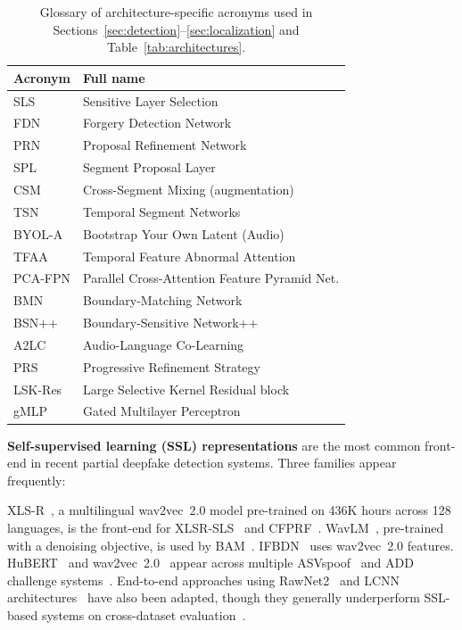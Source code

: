 \documentclass[journal]{IEEEtran}
\begin{document}
\begin{table}[t]
\centering
\caption{Glossary of architecture-specific acronyms used in Sections~\ref{sec:detection}--\ref{sec:localization} and Table~\ref{tab:architectures}.}
\label{tab:glossary}
\small
\begin{tabular}{ll}
\toprule
\textbf{Acronym} & \textbf{Full name} \\
\midrule
SLS & Sensitive Layer Selection \\
FDN & Forgery Detection Network \\
PRN & Proposal Refinement Network \\
SPL & Segment Proposal Layer \\
CSM & Cross-Segment Mixing (augmentation) \\
TSN & Temporal Segment Networks \\
BYOL-A & Bootstrap Your Own Latent (Audio) \\
TFAA & Temporal Feature Abnormal Attention \\
PCA-FPN & Parallel Cross-Attention Feature Pyramid Net. \\
BMN & Boundary-Matching Network~\cite{lin2019bmn} \\
BSN++ & Boundary-Sensitive Network++~\cite{su2021bsnpp} \\
A2LC & Audio-Language Co-Learning \\
PRS & Progressive Refinement Strategy \\
LSK-Res & Large Selective Kernel Residual block \\
gMLP & Gated Multilayer Perceptron \\
\bottomrule
\end{tabular}
\end{table}

\textbf{Self-supervised learning (SSL) representations} are the most common front-end in recent partial deepfake detection systems. Three families appear frequently:

XLS-R~\cite{babu2022xlsr}, a multilingual wav2vec~2.0 model pre-trained on 436K hours across 128 languages, is the front-end for XLSR-SLS~\cite{zhang2024xlrsls} and CFPRF~\cite{wu2024cfprf}. WavLM~\cite{chen2022wavlm}, pre-trained with a denoising objective, is used by BAM~\cite{zhong2024bam}. IFBDN~\cite{cai2024ifbdn} uses wav2vec~2.0 features. HuBERT~\cite{hsu2021hubert} and wav2vec~2.0~\cite{baevski2020wav2vec2} appear across multiple ASVspoof~\cite{wang2020asvspoof2019,nautsch2021asv} and ADD challenge systems~\cite{yi2023add}. End-to-end approaches using RawNet2~\cite{tak2021rawnet2} and LCNN architectures~\cite{chen2020lcnn,lavrentyeva2019stc} have also been adapted, though they generally underperform SSL-based systems on cross-dataset evaluation~\cite{speechdfarena2025,ali2026spoofsuperb}.
\end{document}
